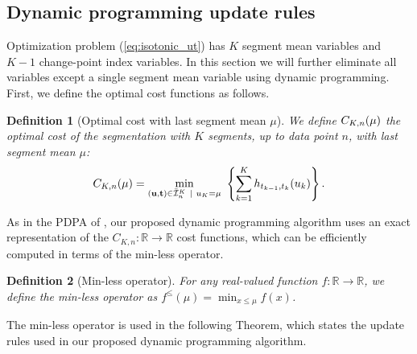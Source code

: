 \documentclass{article}
\newtheorem{definition}{Definition}
\newcommand{\RR}{\mathbb R}
\begin{document}
\subsection{Dynamic programming update rules}

Optimization problem (\ref{eq:isotonic_ut}) has $K$ segment mean
variables and $K-1$ change-point index variables. In this section we
will further eliminate all variables except a single segment mean
variable using dynamic programming. First, we define the optimal cost
functions as follows.



\begin{definition}[Optimal cost with last segment mean $\mu$]
\label{def:fcc}
  We define $C_{K,n}(\mu)$ the optimal cost of the segmentation
  with $K$ segments, up to data point $n$, with last segment mean
  $\mu$:
\begin{equation}
C_{K,n}(\mu) = \min_{(\mathbf u, \mathbf t)\in\bar{\mathcal I}_n^K \ | \ u_K = \mu} \
  \left\{ \sum_{k=1}^K
  h_{t_{k-1}, t_k}(u_k) \right\}.
\end{equation}
\end{definition}

As in the PDPA of \citet{pruned-dp}, our proposed dynamic programming
algorithm uses an exact representation of the
$C_{K,n}:\RR\rightarrow\RR$ cost functions, which can be efficiently
computed in terms of the min-less operator. 

\begin{definition}[Min-less operator]
For any real-valued
function $f:\RR\rightarrow\RR$, we define the min-less operator as
$f^\leq(\mu)=\min_{x\leq \mu} f(x)$.
\end{definition}

The min-less operator is used in the following Theorem, which states
the update rules used in our proposed dynamic programming algorithm.
\end{document}
